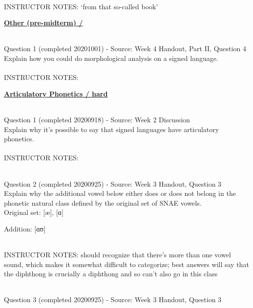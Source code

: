 \documentclass[12pt]{article}
\begin{document}
~\\
INSTRUCTOR NOTES: ‘from that so-called book’


\newpage\textbf{\underline{\huge Other (pre-midterm) / \\}}

~\\

{\large Question 1} (completed 20201001) - Source: Week 4 Handout, Part II, Question 4\\

Explain how you could do morphological analysis on a signed language.\\


~\\
INSTRUCTOR NOTES: 


\newpage\textbf{\underline{\huge Articulatory Phonetics / hard\\}}

~\\

{\large Question 1} (completed 20200918) - Source: Week 2 Discussion\\

Explain why it's possible to say that signed languages have articulatory phonetics.\\


~\\
INSTRUCTOR NOTES: 


~\\

{\large Question 2} (completed 20200925) - Source: Week 3 Handout, Question 3\\

Explain why the additional vowel below either does or does not belong in the phonetic natural class defined by the original set of SNAE vowels.\\

Original set: {[æ]}, {[ɑ]}

Addition: {[ɑʊ]}


~\\
INSTRUCTOR NOTES: should recognize that there's more than one vowel sound, which makes it somewhat difficult to categorize; best answers will say that the diphthong is crucially a diphthong and so can't also go in this class


~\\

{\large Question 3} (completed 20200925) - Source: Week 3 Handout, Question 3\\
\end{document}
